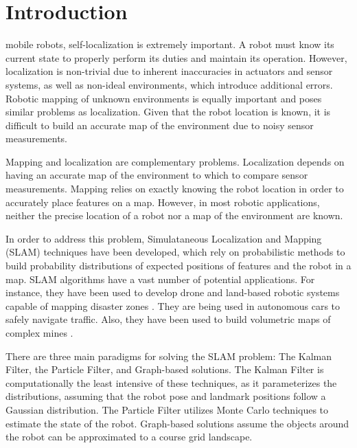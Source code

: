 \documentclass[journal]{IEEEtran}
\begin{document}
\section{Introduction}
% 
% 
% 
% 
 mobile robots, self-localization is extremely important. 
A robot must know its current state to properly perform its duties and maintain its operation. 
However, localization is non-trivial due to inherent inaccuracies in actuators and sensor 
systems, as well as non-ideal environments, which introduce additional errors. Robotic mapping of unknown 
environments is equally important and poses similar problems as localization. Given that 
the robot location is known, it is difficult to build an accurate map of the environment 
due to noisy sensor measurements. 

Mapping and localization are complementary problems. Localization depends on having an 
accurate map of the environment to which to compare sensor measurements. Mapping relies 
on exactly knowing the robot location in order to accurately place features on a map. 
However, in most robotic applications, neither the precise location of a robot nor a 
map of the environment are known. 

In order to address this problem, Simulataneous Localization and Mapping (SLAM) techniques 
have been developed, which rely on probabilistic methods to build probability 
distributions of expected positions of features and the robot in a map. SLAM algorithms 
have a vast number of potential applications. For instance, they have been used to develop 
drone and land-based robotic systems capable of mapping disaster zones 
\cite{drone-response, mapping-disaster-areas}. They are being used in autonomous cars to 
safely navigate traffic. Also, they have been used to build volumetric maps of complex mines
\cite{6d-mining-slam}.

There are three main paradigms for solving the SLAM problem: The Kalman Filter, the Particle 
Filter, and Graph-based solutions. The Kalman Filter is computationally the least intensive 
of these techniques, as it parameterizes the distributions, assuming that the robot pose and landmark positions follow a Gaussian distribution. The Particle Filter utilizes Monte Carlo techniques 
to estimate the state of the robot. Graph-based solutions assume the objects around the robot 
can be approximated to a course grid landscape. \cite{prob-robots}
\end{document}
